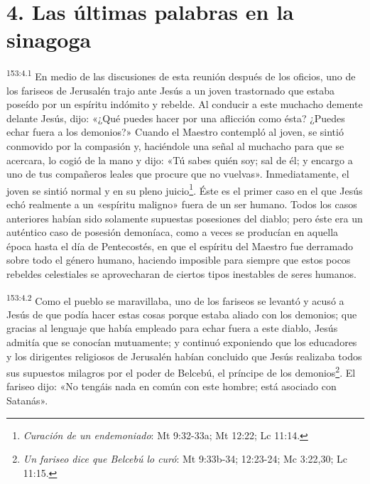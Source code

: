 \section*{4. Las últimas palabras en la sinagoga}
\par
\textsuperscript{153:4.1} En medio de las discusiones de esta reunión después de los oficios, uno de los fariseos de Jerusalén trajo ante Jesús a un joven trastornado que estaba poseído por un espíritu indómito y rebelde. Al conducir a este muchacho demente delante Jesús, dijo: «¿Qué puedes hacer por una aflicción como ésta? ¿Puedes echar fuera a los demonios?» Cuando el Maestro contempló al joven, se sintió conmovido por la compasión y, haciéndole una señal al muchacho para que se acercara, lo cogió de la mano y dijo: «Tú sabes quién soy; sal de él; y encargo a uno de tus compañeros leales que procure que no vuelvas». Inmediatamente, el joven se sintió normal y en su pleno juicio\footnote{\textit{Curación de un endemoniado}: Mt 9:32-33a; Mt 12:22; Lc 11:14.}. Éste es el primer caso en el que Jesús echó realmente a un «espíritu maligno» fuera de un ser humano. Todos los casos anteriores habían sido solamente supuestas posesiones del diablo; pero éste era un auténtico caso de posesión demoníaca, como a veces se producían en aquella época hasta el día de Pentecostés, en que el espíritu del Maestro fue derramado sobre todo el género humano, haciendo imposible para siempre que estos pocos rebeldes celestiales se aprovecharan de ciertos tipos inestables de seres humanos.

\par
\textsuperscript{153:4.2} Como el pueblo se maravillaba, uno de los fariseos se levantó y acusó a Jesús de que podía hacer estas cosas porque estaba aliado con los demonios; que gracias al lenguaje que había empleado para echar fuera a este diablo, Jesús admitía que se conocían mutuamente; y continuó exponiendo que los educadores y los dirigentes religiosos de Jerusalén habían concluido que Jesús realizaba todos sus supuestos milagros por el poder de Belcebú, el príncipe de los demonios\footnote{\textit{Un fariseo dice que Belcebú lo curó}: Mt 9:33b-34; 12:23-24; Mc 3:22,30; Lc 11:15.}. El fariseo dijo: «No tengáis nada en común con este hombre; está asociado con Satanás».

